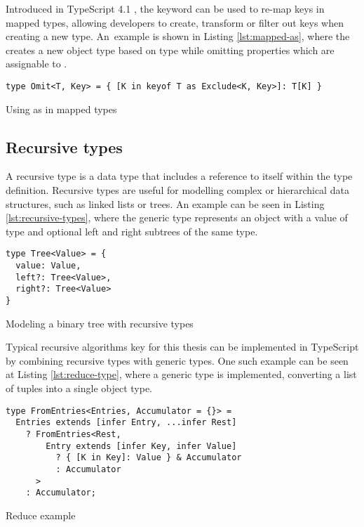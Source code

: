 Introduced in TypeScript 4.1 \cite{AnnouncingTypeScript4.1}, the  keyword can be used to re-map keys in mapped types, allowing developers to create, transform or filter out keys when creating a new type. An~example is shown in Listing \ref{lst:mapped-as}, where the  creates a new object type based on type  while omitting properties which are assignable to .

\begin{listing}[ht!]
  \begin{verbatim}
type Omit<T, Key> = { [K in keyof T as Exclude<K, Key>]: T[K] }
\end{verbatim}
  \caption{Using as in mapped types}\label{lst:mapped-as}
\end{listing}

\clearpage

\subsection{Recursive types}

A recursive type is a data type that includes a reference to itself within the type definition. Recursive types are useful for modelling complex or hierarchical data structures, such as linked lists or trees. An example can be seen in Listing \ref{lst:recursive-types}, where the  generic type represents an object with a value of type  and optional left and right subtrees of the same type.

\begin{listing}[ht]
  \begin{verbatim}
type Tree<Value> = {
  value: Value,
  left?: Tree<Value>,
  right?: Tree<Value>
}
\end{verbatim}
  \caption{Modeling a binary tree with recursive types}\label{lst:recursive-types}
\end{listing}

Typical recursive algorithms key for this thesis can be implemented in TypeScript by combining recursive types with generic types. One such example can be seen at Listing \ref{lst:reduce-type}, where a  generic type is implemented, converting a list of  tuples into a single object type.

\begin{listing}[ht]
  \begin{verbatim}
type FromEntries<Entries, Accumulator = {}> =
  Entries extends [infer Entry, ...infer Rest]
    ? FromEntries<Rest,
        Entry extends [infer Key, infer Value]
          ? { [K in Key]: Value } & Accumulator
          : Accumulator
      >
    : Accumulator;
\end{verbatim}
  \caption{Reduce example}\label{lst:reduce-type}
\end{listing}

